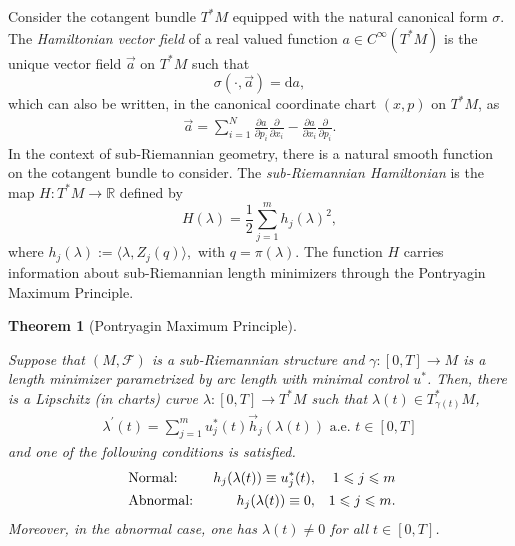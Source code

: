 \documentclass[12pt]{amsart}
\numberwithin{equation}{section}
\theoremstyle{plain}
\newtheorem{theorem}{Theorem}[section]
\theoremstyle{definition}
\theoremstyle{remark}
\begin{document}
Consider the cotangent bundle $T^{\ast}M$ equipped with the natural canonical form $\sigma$. The \emph{Hamiltonian vector field} of a real valued function $a \in  C^{\infty}\left(T^{\ast} M\right)$ is the unique vector field $\vec{a}$ on $T^{\ast}M$ such that
\[
    \sigma(\cdot, \vec{a}) = \mathrm{d} a,
\]
which can also be written, in the canonical coordinate chart $(x, p)$ on $T^*M$, as
\begin{align}\label{Hamiltonian vector field}
    \vec{a}=\sum_{i=1}^N\frac{\partial a}{\partial p_i}\frac{\partial}{\partial x_i}- \frac{\partial a}{\partial x_i}\frac{\partial}{\partial p_i}.
\end{align}
In the context of sub-Riemannian geometry, there is a natural smooth function on the cotangent bundle to consider. The \emph{sub-Riemannian Hamiltonian} is the map $H:T^{\ast}M\rightarrow \mathbb{R}$ defined by
\begin{equation}
    \label{eq:hamiltonian}
    H(\lambda)=\frac{1}{2}\sum_{j=1}^m h_j(\lambda)^2,
\end{equation}
where $h_j(\lambda):=\langle \lambda, Z_j(q)\rangle,$ with $q=\pi(\lambda)$. The function $H$ carries information about sub-Riemannian length minimizers through the Pontryagin Maximum Principle.
\begin{theorem}[Pontryagin Maximum Principle]\label{Pontryagin Maximum Principle}

    Suppose that $(M,\mathcal{F})$ is a sub-Riemannian structure and $\gamma:[0,T]\rightarrow M$ is a length minimizer parametrized by arc length with minimal control $u^{\ast}$. Then, there is a Lipschitz (in charts) curve $\lambda:[0, T]\rightarrow T^{\ast}M$ such that $\lambda(t)\in T^{\ast}_{\gamma(t)}M$,
    \begin{align}\label{extremal cond}
        \lambda^{\prime}(t)=\sum_{j=1}^m u^{\ast}_j(t)\vec{h}_j(\lambda(t)) \text{ a.e. } t\in [0,T]
    \end{align}
    and one of the following conditions is satisfied.
    \begin{align}\label{Pontryagin}
         & \text{ Normal: }   & h_j(\lambda(t))\equiv u^{\ast}_j(t), &  & 1 \leqslant j\leqslant m
        \\
         & \text{ Abnormal: } & h_j(\lambda(t))\equiv 0,             &  & 1 \leqslant j \leqslant m.
        \notag
    \end{align}
    Moreover, in the abnormal case, one has $\lambda(t) \neq 0$ for all $t \in [0, T]$.
\end{theorem}
\end{document}
